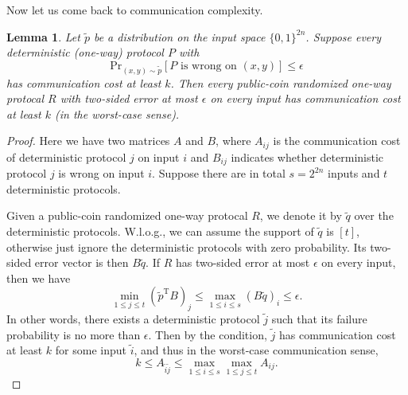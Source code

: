 \documentclass[openany]{book}
\newtheorem{lemma}{Lemma}[chapter]
\begin{document}
Now let us come back to communication complexity.
\begin{lemma}
    Let $\tilde{p}$ be a distribution on the input space $\{0,1\}^{2n}$. Suppose every deterministic (one-way) protocol $P$ with
    \begin{equation*}
        \mathrm{Pr}_{(x,y)\sim \tilde{p}}[P\textrm{ is wrong on }(x,y)]\le\epsilon
    \end{equation*}
    has communication cost at least $k$. Then every public-coin randomized one-way protocal $R$ with two-sided error at most $\epsilon$ on every input has communication cost at least $k$ (in the worst-case sense).
\end{lemma}
\begin{proof}
    Here we have two matrices $A$ and $B$, where $A_{ij}$ is the communication cost of deterministic protocol $j$ on input $i$ and $B_{ij}$ indicates whether deterministic protocol $j$ is wrong on input $i$. Suppose there are in total $s=2^{2n}$ inputs and $t$ deterministic protocols.

    Given a public-coin randomized one-way protocal $R$, we denote it by $\tilde{q}$ over the deterministic protocols. W.l.o.g., we can assume the support of $\tilde{q}$ is $[t]$, otherwise just ignore the deterministic protocols with zero probability. Its two-sided error vector is then $B\tilde{q}$. If $R$ has two-sided error at most $\epsilon$ on every input, then we have
    \begin{equation}
        \min_{1\le j\le t}(\tilde{p}^{\mathrm{T}}B)_j\le \max_{1\le i\le s}(B\tilde{q})_i\le\epsilon.
    \end{equation}
    In other words, there exists a deterministic protocol $\tilde{j}$ such that its failure probability is no more than $\epsilon$. Then by the condition, $\tilde{j}$ has communication cost at least $k$ for some input $\tilde{i}$, and thus in the worst-case communication sense,
    \begin{equation}
        k\le A_{\tilde{i}\tilde{j}}\le\max_{1\le i\le s}\max_{1\le j\le t}A_{ij}.
    \end{equation}
\end{proof}
\end{document}
